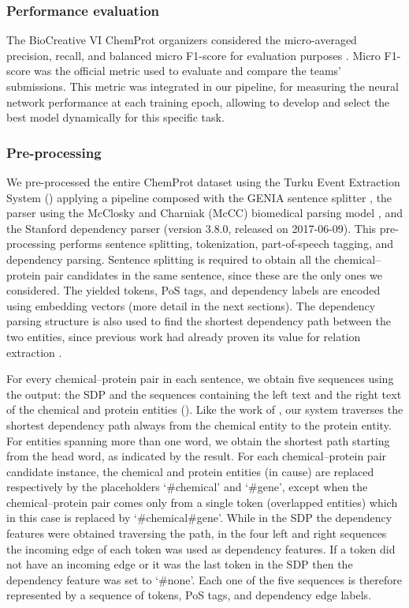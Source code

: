 \subsubsection{Performance evaluation}

The BioCreative VI ChemProt organizers considered the micro-averaged precision, recall, and balanced micro F1-score for evaluation purposes \parencite{krallinger2017a}.
Micro F1-score was the official metric used to evaluate and compare the teams' submissions.
This metric was integrated in our pipeline, for measuring the neural network performance at each training epoch, allowing to develop and select the best model dynamically for this specific task.


\subsubsection{Pre-processing}

We pre-processed the entire ChemProt dataset using the Turku Event Extraction System () \parencite{bjorne2015a} applying a pipeline composed with the GENIA sentence splitter \parencite{saetre2007a}, the  parser \parencite{charniak2005a} using the McClosky and Charniak (McCC) biomedical parsing model \parencite{mcclosky2008a}, and the Stanford dependency parser \parencite{chen2014a} (version 3.8.0, released on 2017-06-09).
This pre-processing performs sentence splitting, tokenization, part-of-speech tagging, and dependency parsing.
Sentence splitting is required to obtain all the chemical--protein pair candidates in the same sentence, since these are the only ones we considered.
The yielded tokens, PoS tags, and dependency labels are encoded using embedding vectors (more detail in the next sections).
The dependency parsing structure is also used to find the shortest dependency path between the two entities, since previous work had already proven its value for relation extraction \parencite{bunescu2005a}.

For every chemical--protein pair in each sentence, we obtain five sequences using the  output: the SDP and the sequences containing the left text and the right text of the chemical and protein entities ().
Like the work of \textcite{mehryary2017a,mehryary2018a}, our system traverses the shortest dependency path always from the chemical entity to the protein entity.
For entities spanning more than one word, we obtain the shortest path starting from the head word, as indicated by the  result.
For each chemical--protein pair candidate instance, the chemical and protein entities (in cause) are replaced respectively by the placeholders `\#chemical' and `\#gene', except when the chemical--protein pair comes only from a single token (overlapped entities) which in this case is replaced by `\#chemical\#gene'.
While in the SDP the dependency features were obtained traversing the path, in the four left and right sequences the incoming edge of each token was used as dependency features.
If a token did not have an incoming edge or it was the last token in the SDP then the dependency feature was set to `\#none'.
Each one of the five sequences is therefore represented by a sequence of tokens, PoS tags, and dependency edge labels.


